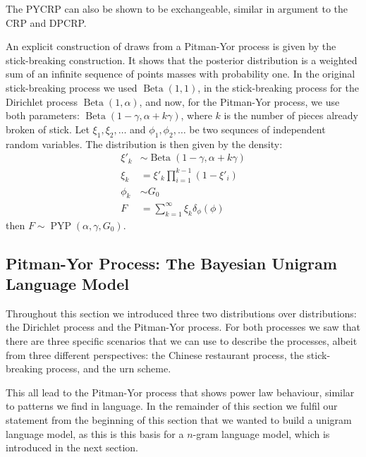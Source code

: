 The PYCRP can also be shown to be exchangeable, similar in argument to the CRP and DPCRP. 

An explicit construction of draws from a Pitman-Yor process is given by the stick-breaking construction. It shows that the posterior distribution is a weighted sum of an infinite sequence of points masses with probability one. In the original stick-breaking process we used $\operatorname{Beta}(1,1)$, in the stick-breaking process for the Dirichlet process $\operatorname{Beta}(1,\alpha)$, and now, for the Pitman-Yor process, we use both parameters: $\operatorname{Beta}(1-\gamma, \alpha+k\gamma)$, where $k$ is the number of pieces already broken of stick. Let $\xi_1,\xi_2,\ldots$ and $\phi_1, \phi_2,\ldots$ be two sequnces of independent random variables. The distribution is then given by the density:
\begin{align}
	\xi'_k &\sim \operatorname{Beta}(1-\gamma, \alpha+k\gamma)\\
    \xi_k &= \xi'_k\prod_{i=1}^{k-1}(1-\xi'_i) \\
	\phi_k &\sim G_0 \\
	F &= \sum_{k=1}^\infty \xi_k \delta_\phi(\phi)
\end{align}
then $F\sim\operatorname{PYP}(\alpha, \gamma, G_0)$.

\subsection{Pitman-Yor Process: The Bayesian Unigram Language Model}
Throughout this section we introduced three two distributions over distributions: the Dirichlet process and the Pitman-Yor process. For both processes we saw that there are three specific scenarios that we can use to describe the processes, albeit from three different perspectives: the Chinese restaurant process, the stick-breaking process, and the urn scheme.

This all lead to the Pitman-Yor process that shows power law behaviour, similar to patterns we find in language. In the remainder of this section we fulfil our statement from the beginning of this section that we wanted to build a unigram language model, as this is this basis for a $n$-gram language model, which is introduced in the next section.

